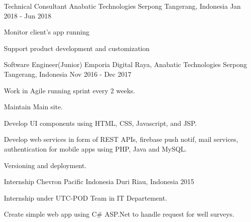 \begin{cventries}
\cventry
    {Technical Consultant}
    {Anabatic Technologies}
    {Serpong Tangerang, Indonesia}
    {Jan 2018 - Jun 2018}
    {
        \begin{cvitems}
            \item {Monitor client's app running}
            \item {Support product development and customization}
        \end{cvitems}
    }

\cventry
    {Software Engineer(Junior)}
    {Emporia Digital Raya, Anabatic Technologies}
    {Serpong Tangerang, Indonesia}
    {Nov 2016 - Dec 2017}
    {
        \begin{cvitems}
            \item {Work in Agile running sprint every 2 weeks.}
            \item {Maintain Main site.}
            \item {Develop UI components using HTML, CSS, Javascript, and JSP.}
            \item {Develop web services in form of REST APIs, firebase push notif, mail services, authentication for mobile apps using PHP, Java and MySQL.}
            \item {Versioning and deployment.}
        \end{cvitems}
    }

\cventry
    {Internship}
    {Chevron Pacific Indonesia}
    {Duri Riau, Indonesia}
    {2015}
    {
        \begin{cvitems}
            \item {Internship under UTC-POD Team in IT Departement.}
            \item {Create simple web app using C\# ASP.Net to handle request for well surveys.}
        \end{cvitems}
    }

\end{cventries}
